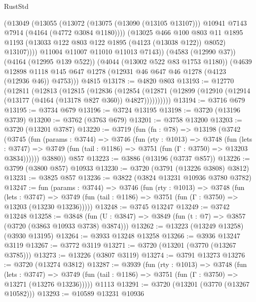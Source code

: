 \begin{lexlean}{RustStd}
\begin{coremodule}
              (@13049
                (@13055
                  (@13072
                    (@13075 (@13090 (@13105 @13107)))
                    @10941
                    @7143
                    @7914
                    (@4164 (@4772 @3084 @1180))))
                (@13025
                  @466
                  @100
                  @803
                  @11
                  @1895
                  @1193
                  (@13033 @122 @803 @122 @1895 (@4123 (@13038 @122)) @8052)
                  @13107))))
          @11004
          @11007
          @11010
          @11013
          @7143))
      (@4583 (@12990 @37))
      (@4164 (@12995 @139 @522))
      (@4044 (@13002 @522 @83 @1753 @1180))
      (@4639 @12898 @1118 @145 @647 @1278 (@12931 @46 @647 @46 @1278 (@4123 (@12936 @46)) @4753)))
    @4815
@13178 := @4820 @803
@13193 := @12770
    (@12811
      (@12813
        (@12815
          (@12836
            (@12854
              (@12871 (@12899 (@12910 (@12914 (@13177 (@4164 (@13178 @827 @360)) @4827))))))))))
@13194 := @3716 @679
@13195 := @3734 @679
@13196 := @3724 @13195
@13198 := @3720 (@13196 @3739)
@13200 := @3762 (@3763 @679)
@13201 := @3758 @13200
@13203 := @3720 (@13201 @3787)
@13220 := @3719
    (fun (fn : @78) =>
    @13198
      (@3742
        (@3745
          (fun (params : @3744) =>
          @3746
            (fun (rty : @1013) =>
            @3748
              (fun (lets : @3747) =>
              @3749 (fun (tail : @1186) => @3751 (fun (Γ : @3750) => @13203 @3834))))))
        @3880))
    @857
@13223 := @3886 (@13196 (@3737 @857))
@13226 := @3799 (@3800 @857) @10933
@13230 := @3720 (@3791 (@13226 @3808) @3812)
@13231 := @3825 @857
@13236 := @3822 (@3824 @13231 @10936 @3780 @3782)
@13247 := fun (params : @3744) =>
  @3746
    (fun (rty : @1013) =>
    @3748
      (fun (lets : @3747) =>
      @3749 (fun (tail : @1186) => @3751 (fun (Γ : @3750) => @13203 (@13230 @13236)))))
@13248 := @3745 @13247
@13249 := @3742 @13248
@13258 := @3848
    (fun (U : @3847) => @3849 (fun (t : @7) => @3857 (@3720 (@3863 @10933 @3738) @3874)))
@13262 := @13223 (@13249 @13258) (@3930 @13195)
@13264 := @3933 @13248 @13258
@13266 := @3936 @13247 @3119
@13267 := @3772 @3119
@13271 := @3720 (@13201 (@3770 (@13267 @3785)))
@13273 := @13226 (@3807 @3119)
@13274 := @3791 @13273
@13276 := @3720 (@13274 @3812)
@13287 := @3939
    (fun (rty : @1013) =>
    @3748
      (fun (lets : @3747) =>
      @3749 (fun (tail : @1186) => @3751 (fun (Γ : @3750) => @13271 (@13276 @13236)))))
    @1113
@13291 := @3720 (@13201 (@3770 (@13267 @10582)))
@13293 := @10589 @13231 @10936

\end{coremodule}
\end{lexlean}
